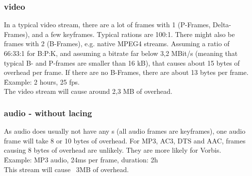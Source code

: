 \documentclass[12pt]{article}
\begin{document}
\subsubsection{video}
In a typical video stream, there are a lot of frames with 1 
(P-Frames, Delta-Frames), and a few keyframes. Typical rations are 100:1.
There might also be frames with 2  (B-Frames), e.g. native MPEG4 streams.
Assuming a ratio of 66:33:1 for B:P:K, and assuming a bitrate far below 3,2 MBit/s
(meaning that typical B- and P-frames are smaller than 16 kB), that causes about 15
bytes of overhead per frame. If there are no B-Frames, there are about 13 bytes per frame.\\[0.3cm]
\f{Example}: 2 hours, 25 fps.\\
The video stream will cause around 2,3 MB of overhead.

\subsubsection{audio - without lacing}
As audio does usually not have any s (all audio frames are keyframes),
one audio frame will take 8 or 10 bytes of overhead. For MP3, AC3, DTS and AAC, 
frames causing 8 bytes of overhead are unlikely. They are more likely for Vorbis.\\[0.3cm]
\f{Example:} MP3 audio, 24ms per frame, duration: 2h\\
This stream will cause ~3MB of overhead.
\end{document}
